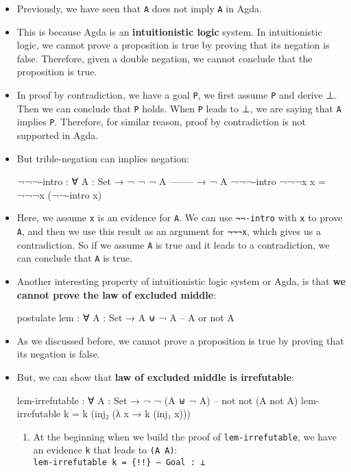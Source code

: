 \documentclass{lecturenotes}
\newcommand{\agdaempty}{\textsf{⊥}\xspace}
\begin{document}
\begin{itemize}
\item Previously, we have seen that \texttt{\lnot \lnot A} does not imply \texttt{A} in Agda.
\item This is because Agda is an \textbf{intuitionistic logic} system. 
      In intuitionistic logic, we cannot prove a proposition is true by proving that its negation is false.
      Therefore, given a double negation, we cannot conclude that the proposition is true.
\item In proof by contradiction, we have a goal \texttt{P}, we first assume \texttt{\lnot P} and derive \agdaempty.
      Then we can conclude that \texttt{P} holds. When \texttt{\lnot P} leads to \agdaempty, we are saying that 
      \texttt{\lnot \lnot A} implies \texttt{P}. Therefore, for similar reason, proof by contradiction is not supported in Agda.

\item But trible-negation can implies negation:
\begin{code}
¬¬¬-intro : ∀ {A : Set}
    → ¬ ¬ ¬ A
    --------
    → ¬ A
¬¬¬-intro ¬¬¬x x = ¬¬¬x (¬¬-intro x)
\end{code}
\item Here, we assume \texttt{x} is an evidence for \texttt{A}. We can use \texttt{¬¬-intro} with \texttt{x} to prove \texttt{\lnot \lnot A},
      and then we use this result as an argument for \texttt{¬¬¬x}, which gives us a contradiction.
      So if we assume \texttt{A} is true and it leads to a contradiction, we can conclude that \texttt{\lnot A} is true.

\item Another interesting property of intuitionistic logic system or Agda, is that
      \textbf{we cannot prove the law of excluded middle}:
\begin{code}
postulate
  lem : ∀ {A : Set} →  A ⊎ ¬ A -- A or not A
\end{code}
\item As we discussed before, we cannot prove a proposition is true by proving that its negation is false.

\item But, we can show that \textbf{law of excluded middle is irrefutable}:
\begin{code}
lem-irrefutable : ∀ {A : Set} → ¬ ¬ (A ⊎ ¬ A) -- not not (A \or not A)
lem-irrefutable k = k (inj₂ (λ x → k (inj₁ x)))
\end{code}

\begin{enumerate}
\item At the beginning when we build the proof of \texttt{lem-irrefutable},
      we have an evidence \texttt{k} that leads to \texttt{\lnot (A \uplus \lnot A)}:
      \\ \texttt{lem-irrefutable k = \{!!\} -- Goal : \agdaempty}


\end{enumerate}
\end{itemize}
\end{document}
